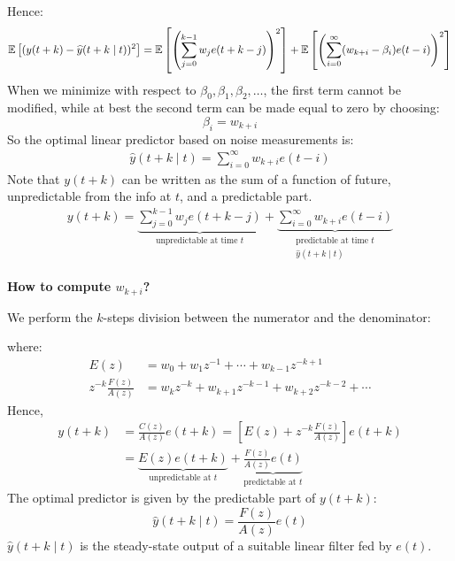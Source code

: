 Hence:
\begin{align*}
	\mathbb{E}\left[(y(t+k)-\widehat{y}(t+k \mid t))^{2}\right]=\mathbb{E}\left[\left(\sum_{j=0}^{k-1} w_{j} e(t+k-j)\right)^{2}\right]+\mathbb{E}\left[\left(\sum_{i=0}^{\infty} (w_{k+i}-\beta_{i}) e(t-i)\right)^{2}\right]
\end{align*}
When we minimize with respect to $\beta_{0}, \beta_{1}, \beta_{2}, \ldots$, the first term cannot be modified, while at best the second term can be made equal to zero by choosing:
\[
	\boxed{\beta_{i} = w_{k+i}}
\]
So the optimal linear predictor based on noise measurements is:
\begin{align*}
	\boxed{\hat{y}(t+k \mid t) = \sum_{i=0}^{\infty}w_{k+i} e(t-i)}
\end{align*}
Note that $y(t+k)$ can be written as the sum of a function of future, unpredictable from the info at $t$, and a predictable part. 
\begin{align*}
	y(t+k)= \underbrace{\sum_{j=0}^{k-1} w_{j} e(t+k-j)}_{\text{unpredictable at time $t$}} + \underbrace{\sum_{i=0}^{\infty} w_{k+i} e(t-i)}_{\substack{\text{predictable at time $t$}\\\hat{y}(t+k \mid t)}}
\end{align*}

\textbf{How to compute $w_{k+i}$?}

We perform the $k$-steps division between the numerator and the denominator:
\begin{figure}[htpb]
	\centering
\end{figure}
\FloatBarrier
where:
\begin{align*}
	E(z)&=w_{0}+w_{1} z^{-1}+\cdots+w_{k-1} z^{-k+1} \\
	z^{-k} \frac{F(z)}{A(z)}&=w_{k} z^{-k}+w_{k+1} z^{-k-1}+w_{k+2} z^{-k-2}+\cdots
\end{align*}
Hence,
\begin{align*}
	y(t+k) &=\frac{C(z)}{A(z)} e(t+k)=\left[E(z)+z^{-k} \frac{F(z)}{A(z)}\right] e(t+k)\\
	&=\underbrace{E(z)e(t+k)}_{\text{unpredictable at }t}+\underbrace{\frac{F(z)}{A(z)}e(t)}_{\text{predictable at }t}
\end{align*}
The optimal predictor is given by the predictable part of $y(t + k)$:
\[
	\boxed{\hat{y}(t+k \mid t) = \frac{F(z)}{A(z)}e(t)}
\]
$\hat{y}(t+k \mid t)$ is the steady-state output of a suitable linear filter fed by $e(t)$.

